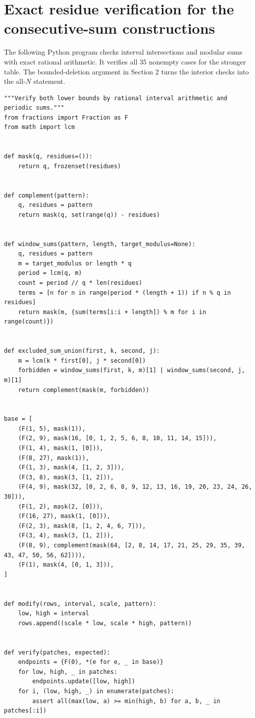 \documentclass[11pt]{article}
\begin{document}
\section{Exact residue verification for the consecutive-sum constructions}
The following Python program checks interval intersections and modular sums with exact rational arithmetic. It verifies all 35 nonempty cases for the stronger table. The bounded-deletion argument in Section 2 turns the interior checks into the all-$N$ statement.
{\footnotesize\begin{verbatim}
"""Verify both lower bounds by rational interval arithmetic and periodic sums."""
from fractions import Fraction as F
from math import lcm


def mask(q, residues=()):
    return q, frozenset(residues)


def complement(pattern):
    q, residues = pattern
    return mask(q, set(range(q)) - residues)


def window_sums(pattern, length, target_modulus=None):
    q, residues = pattern
    m = target_modulus or length * q
    period = lcm(q, m)
    count = period // q * len(residues)
    terms = [n for n in range(period * (length + 1)) if n % q in residues]
    return mask(m, {sum(terms[i:i + length]) % m for i in range(count)})


def excluded_sum_union(first, k, second, j):
    m = lcm(k * first[0], j * second[0])
    forbidden = window_sums(first, k, m)[1] | window_sums(second, j, m)[1]
    return complement(mask(m, forbidden))


base = [
    (F(1, 5), mask(1)),
    (F(2, 9), mask(16, [0, 1, 2, 5, 6, 8, 10, 11, 14, 15])),
    (F(1, 4), mask(1, [0])),
    (F(8, 27), mask(1)),
    (F(1, 3), mask(4, [1, 2, 3])),
    (F(3, 8), mask(3, [1, 2])),
    (F(4, 9), mask(32, [0, 2, 6, 8, 9, 12, 13, 16, 19, 20, 23, 24, 26, 30])),
    (F(1, 2), mask(2, [0])),
    (F(16, 27), mask(1, [0])),
    (F(2, 3), mask(8, [1, 2, 4, 6, 7])),
    (F(3, 4), mask(3, [1, 2])),
    (F(8, 9), complement(mask(64, [2, 8, 14, 17, 21, 25, 29, 35, 39, 43, 47, 50, 56, 62]))),
    (F(1), mask(4, [0, 1, 3])),
]


def modify(rows, interval, scale, pattern):
    low, high = interval
    rows.append((scale * low, scale * high, pattern))


def verify(patches, expected):
    endpoints = {F(0), *(e for e, _ in base)}
    for low, high, _ in patches:
        endpoints.update([low, high])
    for i, (low, high, _) in enumerate(patches):
        assert all(max(low, a) >= min(high, b) for a, b, _ in patches[:i])


\end{verbatim}}
\end{document}
